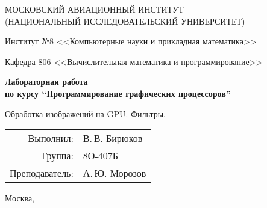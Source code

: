 \begin{titlepage}
\begin{center}
\large
МОСКОВСКИЙ АВИАЦИОННЫЙ ИНСТИТУТ\\ (НАЦИОНАЛЬНЫЙ ИССЛЕДОВАТЕЛЬСКИЙ УНИВЕРСИТЕТ)

\vspace{20pt}

Институт №8 <<Компьютерные науки и прикладная математика>>

Кафедра 806 <<Вычислительная математика и программирование>>
\end{center}

\vspace{60pt}

\begin{center}
\bfseries
\large
Лабораторная работа  \\по курсу \enquote{Программирование графических процессоров}

\vspace{54pt}

Обработка изображений на GPU. Фильтры.
\end{center}

\vfill

\begin{flushright}
\large
\begin{tabular}{rl}
Выполнил: & В.\,В. Бирюков \\
Группа: & 8О-407Б \\
Преподаватель: & А.\,Ю. Морозов \\
\end{tabular}
\end{flushright}

\vspace{92pt}

\begin{center}
\large
Москва, \the\year
\end{center}
\end{titlepage}

\pagebreak
